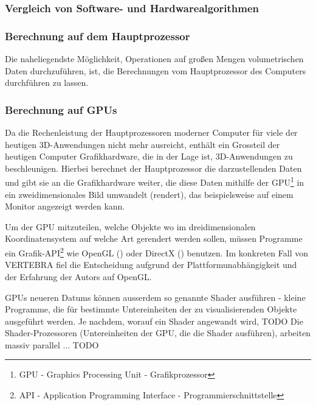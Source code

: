 \documentclass[a4paper,titlepage,12pt]{scrartcl}
\begin{document}
\subsubsection{Vergleich von Software- und Hardwarealgorithmen}\label{ssec:swhwcomparison}
\subsubsection{Berechnung auf dem Hauptprozessor}\label{sssec:cpucalculation}
Die naheliegendste Möglichkeit, Operationen auf großen Mengen volumetrischen Daten durchzuführen, ist, die Berechnungen vom Hauptprozessor des Computers durchführen zu lassen. 
\subsubsection{Berechnung auf GPUs}\label{sssec:gpucalculation}
Da die Rechenleistung der Hauptprozessoren moderner Computer für viele der heutigen 3D-Anwendungen nicht mehr ausreicht, enthält ein Grossteil der heutigen Computer Grafikhardware, die in der Lage ist, 3D-Anwendungen zu beschleunigen. Hierbei berechnet der Hauptprozessor die darzustellenden Daten und gibt sie an die Grafikhardware weiter, die diese Daten mithilfe der GPU\footnote{GPU - Graphics Processing Unit - Grafikprozessor} in ein zweidimensionales Bild umwandelt (rendert), das beispielsweise auf einem Monitor angezeigt werden kann.

Um der GPU mitzuteilen, welche Objekte wo im dreidimensionalen Koordinatensystem auf welche Art gerendert werden sollen, müssen Programme ein Grafik-API\footnote{API - Application Programming Interface - Programmierschnittstelle} wie OpenGL (\cite{OpenGLWebsite}) oder DirectX (\cite{DirectXWebsite}) benutzen. Im konkreten Fall von VERTEBRA fiel die Entscheidung aufgrund der Plattformunabhängigkeit und der Erfahrung der Autors auf OpenGL.

GPUs neueren Datums können ausserdem so genannte Shader ausführen - kleine Programme, die für bestimmte Untereinheiten der zu visualisierenden Objekte ausgeführt werden. Je nachdem, worauf ein Shader angewandt wird, TODO Die Shader-Prozessoren (Untereinheiten der GPU, die die Shader ausführen), arbeiten massiv parallel ... TODO
\end{document}
